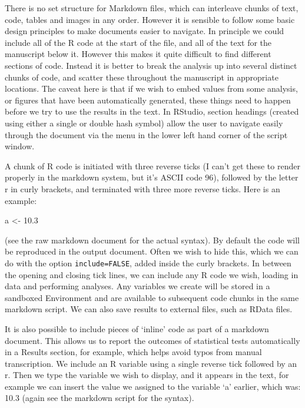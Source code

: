 \documentclass[
]{article}
\newenvironment{Shaded}{\begin{snugshade}}{\end{snugshade}}
\newcommand{\FloatTok}[1]{\textcolor[rgb]{0.00,0.00,0.81}{#1}}
\newcommand{\NormalTok}[1]{#1}
\newcommand{\OtherTok}[1]{\textcolor[rgb]{0.56,0.35,0.01}{#1}}
\begin{document}
There is no set structure for Markdown files, which can interleave chunks of text, code, tables and images in any order. However it is sensible to follow some basic design principles to make documents easier to navigate. In principle we could include all of the R code at the start of the file, and all of the text for the manuscript below it. However this makes it quite difficult to find different sections of code. Instead it is better to break the analysis up into several distinct chunks of code, and scatter these throughout the manuscript in appropriate locations. The caveat here is that if we wish to embed values from some analysis, or figures that have been automatically generated, these things need to happen before we try to use the results in the text. In RStudio, section headings (created using either a single or double hash symbol) allow the user to navigate easily through the document via the menu in the lower left hand corner of the script window.

A chunk of R code is initiated with three reverse ticks (I can't get these to render properly in the markdown system, but it's ASCII code 96), followed by the letter r in curly brackets, and terminated with three more reverse ticks. Here is an example:

\begin{Shaded}
\begin{Highlighting}[]
\NormalTok{a }\OtherTok{\textless{}{-}} \FloatTok{10.3}
\end{Highlighting}
\end{Shaded}

(see the raw markdown document for the actual syntax). By default the code will be reproduced in the output document. Often we wish to hide this, which we can do with the option \texttt{include=FALSE}, added inside the curly brackets. In between the opening and closing tick lines, we can include any R code we wish, loading in data and performing analyses. Any variables we create will be stored in a sandboxed Environment and are available to subsequent code chunks in the same markdown script. We can also save results to external files, such as RData files.

It is also possible to include pieces of `inline' code as part of a markdown document. This allows us to report the outcomes of statistical tests automatically in a Results section, for example, which helps avoid typos from manual transcription. We include an R variable using a single reverse tick followed by an r. Then we type the variable we wish to display, and it appears in the text, for example we can insert the value we assigned to the variable `a' earlier, which was: 10.3 (again see the markdown script for the syntax).
\end{document}
